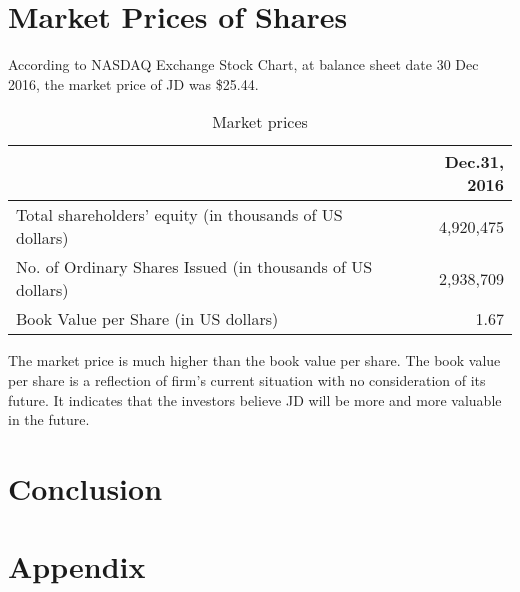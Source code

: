 \section{Market Prices of Shares}
According to NASDAQ Exchange Stock Chart, at balance sheet date 30 Dec 2016, the market price of JD was \$25.44.

\begin{table}[H]	
	\begin{center}
		\begin{tabular}{p{11cm}r}
			\toprule
			&\textbf{Dec.31, 2016}\\
			\midrule
			Total shareholders’ equity (in thousands of US dollars)&	4,920,475\\
			No. of Ordinary Shares Issued (in thousands of US dollars) &	2,938,709\\
			Book Value per Share (in US dollars) &	1.67\\
			\bottomrule
		\end{tabular}
	\end{center}
	\caption{Market prices}\label{table:1}
\end{table}

The market price is much higher than the book value per share. The book value per share is a reflection of firm’s current situation with no consideration of its future. It indicates that the investors believe JD will be more and more valuable in the future.

\section{Conclusion}

\newpage

\section*{Appendix}




%
%
%


